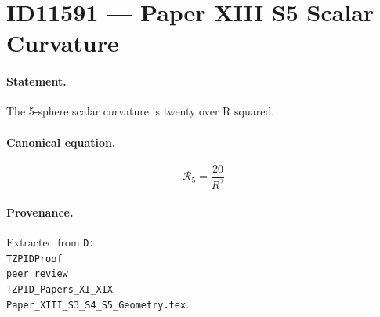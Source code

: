 \section*{ID11591 --- Paper XIII S5 Scalar Curvature}

\paragraph{Statement.}
The 5-sphere scalar curvature is twenty over R squared.

\paragraph{Canonical equation.}
\[
\mathcal{R}_5=\frac{20}{R^2}
\]

\paragraph{Provenance.}
Extracted from \texttt{D:\\TZPIDProof\\peer\_review\\TZPID\_Papers\_XI\_XIX\\Paper\_XIII\_S3\_S4\_S5\_Geometry.tex}.
